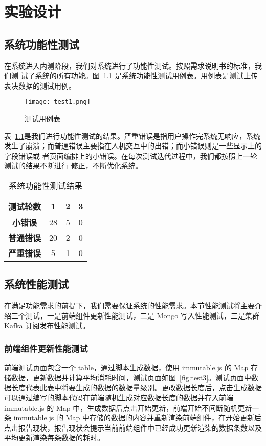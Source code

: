 
\chapter{实验设计}

\section{系统功能性测试}
在系统进入内测阶段，我们对系统进行了功能性测试。按照需求说明书的标准，我们测
试了系统的所有功能。图~\ref{fig:test1} 是系统功能性测试用例表。用例表是测试上传表决数据的测试用例。

\begin{figure}[!htp]
    \centering
    \texttt{[image: test1.png]}
    \caption{测试用例表}
    \label{fig:test1}
  \end{figure}

  表~\ref{fig:test2}是我们进行功能性测试的结果。严重错误是指用户操作完系统无响应，系统发生了崩溃；而普通错误主要指在人机交互中的出错；而小错误则是一些显示上的字段错误或
  者页面编排上的小错误。在每次测试迭代过程中，我们都按照上一轮测试的结果不断进行
  修正，不断优化系统。

  \begin{table}[h!]
    \begin{center}
      \caption{系统功能性测试结果}
      \label{fig:test2}
      \begin{tabular}{ c c c c }
        \hline
        \textbf{测试轮数} & 1 & 2 & 3 \\
        \hline
        \textbf{小错误} & 28 & 5 & 0 \\
        \textbf{普通错误} & 20 & 2 & 0 \\
        \textbf{严重错误} & 5 & 1 & 0 \\
        \hline
      \end{tabular}
    \end{center}
  \end{table}

\section{系统性能测试}
在满足功能需求的前提下，我们需要保证系统的性能需求。本节性能测试将主要介绍三个测试，一是前端组件更新性能测试，二是 Mongo 写入性能测试，三是集群 Kafka 订阅发布性能测试。

\subsection{前端组件更新性能测试}
前端测试页面包含一个 table，通过脚本生成数据，使用 immutable.js 的 Map 存储数据，更新数据并计算平均消耗时间，测试页面如图~\ref{fig:test3}。测试页面中数据长度代表此表中将要生成的数据的数据量级别。更改数据长度后，点击生成数据可以通过编写的脚本代码在前端随机生成对应数据长度的数据并存入前端 immutable.js 的 Map 中，生成数据后点击开始更新，前端开始不间断随机更新一条 immutable.js 的 Map 中存储的数据的内容并重新渲染前端组件，在开始更新后点击报告现状，报告现状会提示当前前端组件中已经成功更新渲染的数据条数以及平均更新渲染每条数据的耗时。

